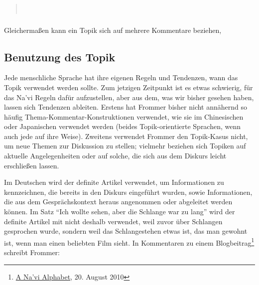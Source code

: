 \begin{quotation}
\noindent{}\\
\indent{}
\end{quotation}

\subsubsection{} Gleichermaßen kann ein Topik sich auf mehrere Kommentare beziehen, 

\begin{quotation}
\noindent{}

\end{quotation}

\subsection{Benutzung des Topik}
Jede menschliche Sprache hat ihre eigenen Regeln und Tendenzen, wann das Topik verwendet werden sollte. Zum jetzigen Zeitpunkt ist es etwas schwierig, für das Na'vi Regeln dafür aufzustellen, aber aus dem, was wir bisher gesehen haben, lassen sich Tendenzen ableiten. Erstens hat Frommer bisher nicht annähernd so häufig Thema-Kommentar-Konstruktionen verwendet, wie sie im Chinesischen oder Japanischen verwendet werden (beides Topik-orientierte Sprachen, wenn auch jede auf ihre Weise). Zweitens verwendet Frommer den Topik-Kasus nicht, um neue Themen zur Diskussion zu stellen; vielmehr beziehen sich Topiken auf aktuelle Angelegenheiten oder auf solche, die sich aus dem Diskurs leicht erschließen lassen.

Im Deutschen wird der definite Artikel  verwendet, um Informationen zu kennzeichnen, die bereits in den Diskurs eingeführt wurden, sowie Informationen, die aus dem Gesprächskontext heraus angenommen oder abgeleitet werden können. Im Satz ``Ich wollte  sehen, aber die Schlange war zu lang'' wird der definite Artikel mit  nicht deshalb verwendet, weil zuvor über Schlangen gesprochen wurde, sondern weil das Schlangestehen etwas ist, das man gewohnt ist, wenn man einen beliebten Film sieht. In Kommentaren zu einem Blogbeitrag\footnote{\href{https://naviteri.org/2010/08/20/}{A Na'vi Alphabet}, 20. August 2010} schreibt Frommer: 

